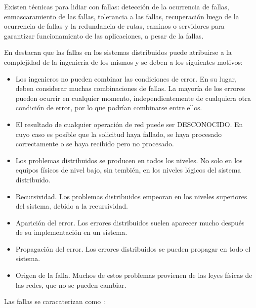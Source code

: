  Existen técnicas  para lidiar con fallas: detección de la ocurrencia de fallas, enmascaramiento de las fallas, tolerancia a las  fallas, recuperación luego de la ocurrencia de fallas y la redundancia de rutas, caminos o servidores para garantizar funcionamiento de las aplicaciones, a pesar de la fallas. 

En   
destacan que las fallas en los sistemas distribuidos puede atribuirse a  la complejidad de la ingeniería de los mismos   y se deben a los siguientes motivos: 



\begin{itemize}
	\item { Los ingenieros no pueden combinar las condiciones de error}. En su lugar, deben considerar muchas combinaciones de fallas. La mayoría de los errores pueden ocurrir en cualquier momento, independientemente de cualquiera otra condición de error, por lo que podrían combinarse entre ellos.
	
	\item {El resultado de cualquier operación de red puede ser DESCONOCIDO}. En cuyo caso es posible que la solicitud haya fallado, se haya procesado correctamente o se haya recibido pero no procesado.
	
	\item  {Los problemas distribuidos se producen en todos los niveles}. No solo en los equipos físicos de nivel bajo, sin tembi\'en, en los niveles lógicos del sistema distribuido.
	
	\item {Recursividad}.  Los problemas distribuidos empeoran en los niveles superiores del sistema, debido a la recursividad. 
	
	\item {Aparición del error}. Los errores distribuidos suelen aparecer mucho después de su implementación en un sistema.
	
	\item {Propagación del error}. Los errores distribuidos se pueden propagar en todo el sistema. 
	
	\item  {Origen de la falla}. Muchos de estos problemas provienen de las leyes físicas de las redes, que no se pueden cambiar.
\end{itemize}
Las fallas se caracaterizan como :
	
